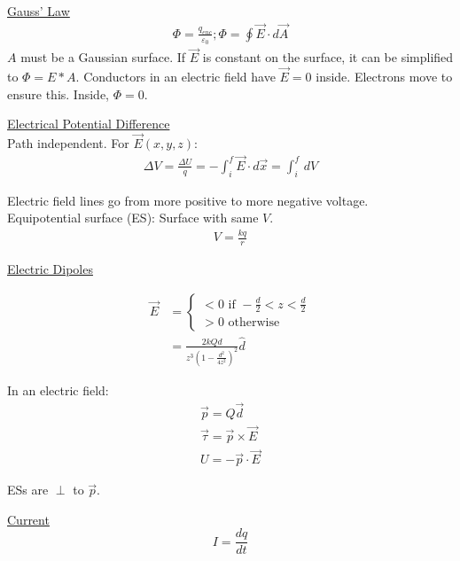 \documentclass[8pt]{minimal}
\begin{document}
\underline{Gauss' Law}
\begin{gather*}
    \Phi = \frac{q_{enc}}{\varepsilon_0};
    \Phi = \oint \vec{E} \cdot d\vec{A}
\end{gather*}
$A$ must be a Gaussian surface. 
If $\vec{E}$ is constant on the surface, it can be simplified to $\Phi = E*A$.
Conductors in an electric field have $\vec{E} = 0$ inside. 
Electrons move to ensure this. 
Inside, $\Phi = 0$.


\underline{Electrical Potential Difference}\\
Path independent. For $\vec{E}(x,y,z)$:
\begin{gather*}
    \Delta V = \frac{\Delta U}{q} = -\int_{i}^{f} \vec{E}\cdot d\vec{x} = \int_{i}^{f}\,dV
\end{gather*}

Electric field lines go from more positive to more negative voltage.\\
Equipotential surface (ES): Surface with same $V$.
\begin{gather*}
    V = \frac{kq}{r}
\end{gather*}


\underline{Electric Dipoles}

\begin{align*}
    \vec{E} &= \left\{ \begin{matrix}
        < 0 \text{ if } -\frac{d}{2} < z < \frac{d}{2}\\
        > 0 \text{ otherwise}
    \end{matrix} \right.\\
        &=  \frac{2kQd}{z^3\left(1 - \frac{d^2}{4z^2}\right)^2}\hat{d}
\end{align*}

In an electric field:
\begin{gather*}
    \vec{p} = Q\vec{d}\\
    \vec{\tau} = \vec{p} \times \vec{E}\\
    U = -\vec{p} \cdot \vec{E}
\end{gather*}

ESs are $\perp$ to $\vec{p}$.


\underline{Current}
\[ I = \frac{dq}{dt} \]
\end{document}
